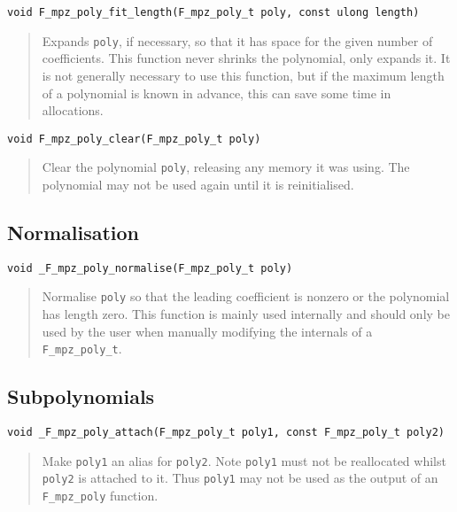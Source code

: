 \documentclass[a4paper,10pt]{article}
\newcommand{\code}{\lstinline}
\begin{document}
\begin{lstlisting}
void F_mpz_poly_fit_length(F_mpz_poly_t poly, const ulong length)
\end{lstlisting}
\begin{quote}
Expands \code{poly}, if necessary, so that it has space for the given number of coefficients. This function
never shrinks the polynomial, only expands it. It is not generally necessary to use this function, but
if the maximum length of a polynomial is known in advance, this can save some time in allocations.
\end{quote}

\begin{lstlisting}
void F_mpz_poly_clear(F_mpz_poly_t poly)
\end{lstlisting}
\begin{quote}
Clear the polynomial \code{poly}, releasing any memory it was using. The polynomial may not be used again 
until it is reinitialised.
\end{quote}

\subsection{Normalisation}

\begin{lstlisting}
void _F_mpz_poly_normalise(F_mpz_poly_t poly)
\end{lstlisting}
\begin{quote}
Normalise \code{poly} so that the leading coefficient is nonzero or the polynomial has length zero. This 
function is mainly used internally and should only be used by the user when manually modifying the
internals of a \code{F_mpz_poly_t}.
\end{quote}

\subsection{Subpolynomials}

\begin{lstlisting}
void _F_mpz_poly_attach(F_mpz_poly_t poly1, const F_mpz_poly_t poly2)
\end{lstlisting}
\begin{quote}
Make \code{poly1} an alias for \code{poly2}. Note \code{poly1} must not be reallocated whilst \code{poly2} 
is attached to it. Thus \code{poly1} may not be used as the output of an \code{F_mpz_poly} function.
\end{quote}
\end{document}
